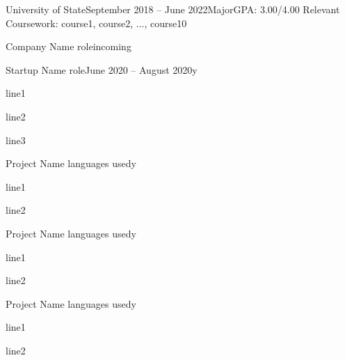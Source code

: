 \documentclass[hidelinks]{simp_styling} %
\begin{document}
\printname
\printbyline



\begin{rEducation}{University of State}{September 2018 – June 2022}{Major}{GPA: 3.00/4.00}
Relevant Coursework: course1, course2, ..., course10
\end{rEducation}


\begin{rSubsection}{Company Name}{\textcolor{gray}{\textbar} role}{incoming}{}
\end{rSubsection}

\begin{rSubsection}{Startup Name}{\textcolor{gray}{\textbar} role}{June 2020 – August 2020}{y}
\item line1
\item line2
\item line3
\end{rSubsection}



\begin{rSubsection}{Project Name}{\textcolor{gray}{\textbar} languages used}{}{y}
\item line1
\item line2
\end{rSubsection}

\begin{rSubsection}{Project Name}{\textcolor{gray}{\textbar} languages used}{}{y}
\item line1
\item line2
\end{rSubsection}

\begin{rSubsection}{Project Name}{\textcolor{gray}{\textbar} languages used}{}{y}
\item line1
\item line2
\end{rSubsection}
\end{document}
